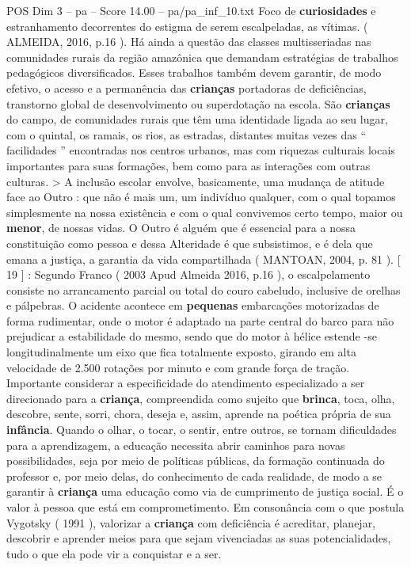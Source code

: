 \begin{textsample}{POS Dim 3 – pa – Score 14.00 – pa/pa\_inf\_10.txt}
Foco de \textbf{curiosidades} e estranhamento decorrentes do estigma de serem escalpeladas, as vítimas. ( ALMEIDA, 2016, p.16 ).
Há ainda a questão das classes multisseriadas nas comunidades rurais da região amazônica que demandam estratégias de trabalhos pedagógicos diversificados.
Esses trabalhos também devem garantir, de modo efetivo, o acesso e a permanência das \textbf{crianças} portadoras de deficiências, transtorno global de desenvolvimento ou superdotação na escola.
São \textbf{crianças} do campo, de comunidades rurais que têm uma identidade ligada ao seu lugar, com o quintal, os ramais, os rios, as estradas, distantes muitas vezes das “ facilidades ” encontradas nos centros urbanos, mas com riquezas culturais locais importantes para suas formações, bem como para as interações com outras culturas. > A inclusão escolar envolve, basicamente, uma mudança de atitude face ao Outro : que não é mais um, um indivíduo qualquer, com o qual topamos simplesmente na nossa existência e com o qual convivemos certo tempo, maior ou \textbf{menor}, de nossas vidas.
O Outro é alguém que é essencial para a nossa constituição como pessoa e dessa Alteridade é que subsistimos, e é dela que emana a justiça, a garantia da vida compartilhada ( MANTOAN, 2004, p. 81 ). [ 19 ] : Segundo Franco ( 2003 Apud Almeida 2016, p.16 ), o escalpelamento consiste no arrancamento parcial ou total do couro cabeludo, inclusive de orelhas e pálpebras.
O acidente acontece em \textbf{pequenas} embarcações motorizadas de forma rudimentar, onde o motor é adaptado na parte central do barco para não prejudicar a estabilidade do mesmo, sendo que do motor à hélice estende -se longitudinalmente um eixo que fica totalmente exposto, girando em alta velocidade de 2.500 rotações por minuto e com grande força de tração.
Importante considerar a especificidade do atendimento especializado a ser direcionado para a \textbf{criança}, compreendida como sujeito que \textbf{brinca}, toca, olha, descobre, sente, sorri, chora, deseja e, assim, aprende na poética própria de sua \textbf{infância}.
Quando o olhar, o tocar, o sentir, entre outros, se tornam dificuldades para a aprendizagem, a educação necessita abrir caminhos para novas possibilidades, seja por meio de políticas públicas, da formação continuada do professor e, por meio delas, do conhecimento de cada realidade, de modo a se garantir à \textbf{criança} uma educação como via de cumprimento de justiça social.
É o valor à pessoa que está em comprometimento.
Em consonância com o que postula Vygotsky ( 1991 ), valorizar a \textbf{criança} com deficiência é acreditar, planejar, descobrir e aprender meios para que sejam vivenciadas as suas potencialidades, tudo o que ela pode vir a conquistar e a ser.

\end{textsample}
